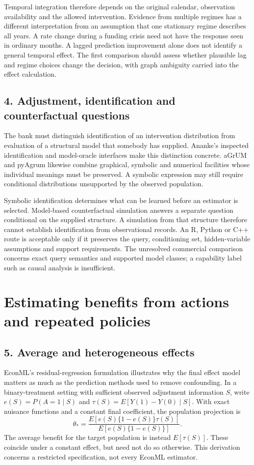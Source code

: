 Temporal integration therefore depends on the original calendar, observation
availability and the allowed intervention. Evidence from multiple regimes
has a different interpretation from an assumption that one stationary regime
describes all years. A rate change during a funding crisis need not have the response seen
in ordinary months. A lagged prediction improvement alone does not identify a general temporal
effect. The first comparison should assess whether plausible
lag and regime choices change the decision, with graph ambiguity carried into
the effect calculation.

\subsection{4. Adjustment, identification and counterfactual questions}
The bank must distinguish identification of an intervention distribution from
evaluation of a structural model that somebody has supplied. Ananke's inspected
identification and model-oracle interfaces make this distinction concrete.
aGrUM and pyAgrum likewise combine graphical, symbolic and numerical facilities
whose individual meanings must be preserved. A symbolic expression may still
require conditional distributions unsupported by the observed population.
\citep{exec24_ananke_source,exec19_cxx_identification_source,exec24_agrum_source}

Symbolic identification determines what can be learned before an estimator
is selected. Model-based counterfactual simulation answers a separate question
conditional on the supplied structure. A simulation from that structure
therefore cannot establish identification from observational records.
An R, Python or C++ route is acceptable only if it preserves the query,
conditioning set, hidden-variable assumptions and support requirements. The
unresolved commercial comparison concerns exact query semantics and supported
model classes; a capability label such as causal analysis is insufficient.

\section{Estimating benefits from actions and repeated policies}

\subsection{5. Average and heterogeneous effects}
EconML's residual-regression formulation illustrates why the final effect model
matters as much as the prediction methods used to remove confounding. In a
binary-treatment setting with sufficient observed adjustment information $S$,
write $e(S)=P(A=1\mid S)$ and $\tau(S)=E[Y(1)-Y(0)\mid S]$. With exact nuisance
functions and a constant final coefficient, the population projection is
\[
 \theta_* = \frac{E[e(S)\{1-e(S)\}\tau(S)]}
                   {E[e(S)\{1-e(S)\}]}.
\]
The average benefit for the target population is instead $E[\tau(S)]$.
These coincide under a constant effect, but need not do so otherwise. This
derivation concerns a restricted specification, not every EconML estimator.
\citep{exec19_econml_source}

